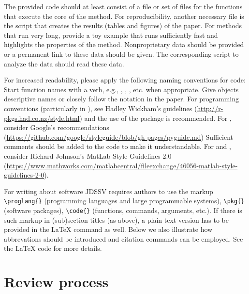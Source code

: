 \documentclass[article]{jdssv}
\begin{document}
The provided code should at least consist of a file or set of files for the functions that execute the core of the method. For reproducibility, another necessary file is the script that creates the results (tables and figures) of the paper. For methods that run very long, provide a toy example that runs sufficiently fast and highlights the properties of the method. Nonproprietary data should be provided or a permanent link to these data should be given. The corresponding script to analyze the data should read these data. 

\begin{sloppypar}
For increased readability, please apply the following naming conventions for code: Start function names with a verb, e.g., , , , etc. when appropriate. Give  objects descriptive names or closely follow the notation in the paper.
For programming conventions (particularly in ), see Hadley Wickham's guidelines (\url{http://r-pkgs.had.co.nz/style.html}) and the use of the  package is recommended. For , consider Google's recommendations (\url{https://github.com/google/styleguide/blob/gh-pages/pyguide.md}) Sufficient comments should be added to the code to make it understandable. For  and  \citep{matlab}, consider Richard Johnson's MatLab Style Guidelines 2.0 (\url{https://www.mathworks.com/matlabcentral/fileexchange/46056-matlab-style-guidelines-2-0}).
\end{sloppypar}

For writing about software JDSSV requires authors to use the markup
\verb|\proglang{}| (programming languages and large programmable systems), \verb|\pkg{}| (software packages), \verb|\code{}| (functions, commands, arguments, etc.). If there is such markup in (sub)section titles (as above), a plain text version has to be provided in the {\LaTeX} command as well. Below we also illustrate how abbrevations should be introduced and citation commands can be employed. See the {\LaTeX} code for more details.

\section{Review process}
\end{document}
